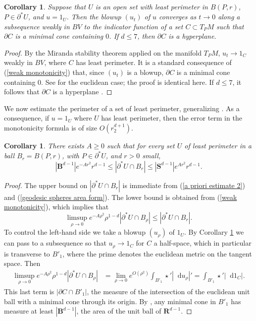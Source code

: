 \documentclass[reqno,11pt]{amsart}
\newcommand{\RR}{\mathbf{R}}
\newcommand{\Sph}{\mathbf S}
\newcommand{\Ball}{\mathbf{B}}
\newcommand*\dif{\mathop{}\!\mathrm{d}}
\newtheorem{corollary}[theorem]{Corollary}
\theoremstyle{definition}
\numberwithin{equation}{section}
\begin{document}
\begin{corollary}\label{blowup theorem}
Suppose that $U$ is an open set with least perimeter in $B(P, r)$, $P \in \partial^* U$, and $u = 1_U$.
Then the blowup $(u_t)$ of $u$ converges as $t \to 0$ along a subsequence weakly in $BV$ to the indicator function of a set $C \subset T_PM$ such that $\partial C$ is a minimal cone containing $0$.
If $d \leq 7$, then $\partial C$ is a hyperplane.
\end{corollary}
\begin{proof}
By the Miranda stability theorem applied on the manifold $T_PM$, $u_t \to 1_C$ weakly in $BV$, where $C$ has least perimeter.
It is a standard consequence of (\ref{weak monotonicity}) that, since $(u_t)$ is a blowup, $\partial C$ is a minimal cone containing $0$.
See \cite[Theorem 9.3]{Giusti77} for the euclidean case; the proof is identical here.
If $d \leq 7$, it follows that $\partial C$ is a hyperplane \cite[Theorem 9.10 and Theorem 10.10]{Giusti77}.
\end{proof}

We now estimate the perimeter of a set of least perimeter, generalizing \cite[Remark 5.13]{Giusti77}.
As a consequence, if $u = 1_U$ where $U$ has least perimeter, then the error term in the monotonicity formula is of size $O(r_2^{d + 1})$.

\begin{corollary}\label{doubling dimension}
There exists $A \geq 0$ such that for every set $U$ of least perimeter in a ball $B_r = B(P, r)$, with $P \in \partial^* U$, and $r > 0$ small,
$$|\Ball^{d - 1}|e^{-Ar^2}r^{d - 1} \leq |\partial^*U \cap B_r| \leq |\Sph^{d - 1}|e^{Ar^2} r^{d - 1}.$$
\end{corollary}
\begin{proof}
The upper bound on $|\partial^* U \cap B_r|$ is immediate from (\ref{a priori estimate 2}) and (\ref{geodesic spheres area form}).
The lower bound is obtained from (\ref{weak monotonicity}), which implies that
$$\limsup_{\rho \to 0} e^{-A\rho^2} \rho^{1 - d} |\partial^* U \cap B_\rho| \leq |\partial^* U \cap B_r|.$$
To control the left-hand side we take a blowup $(u_\rho)$ of $1_U$.
By Corollary \ref{blowup theorem} we can pass to a subsequence so that $u_\rho \to 1_C$ for $C$ a half-space, which in particular is transverse to $B'_1$, where the prime denotes the euclidean metric on the tangent space.
Then
\begin{align*}
\limsup_{\rho \to 0} e^{-A\rho^2} \rho^{1 - d} |\partial^* U \cap B_\rho| &= \lim_{\rho \to 0} e^{O(\rho^2)} \int_{B'_1} \star'|\dif u_\rho|' = \int_{B'_1} \star'|\dif 1_C|.
\end{align*}
This last term is $|\partial C \cap B'_1|$, the measure of the intersection of the euclidean unit ball with a minimal cone through its origin.
By \cite[(5.16)]{Giusti77}, any minimal cone in $B'_1$ has measure at least $|\Ball^{d - 1}|$, the area of the unit ball of $\RR^{d - 1}$.
\end{proof}
\end{document}
